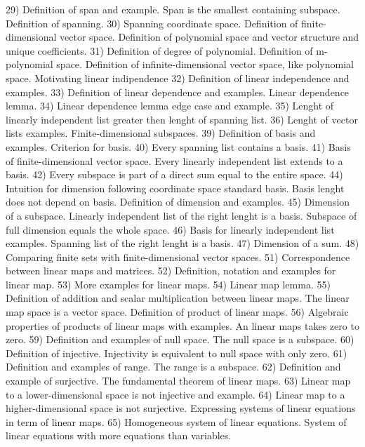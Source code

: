 \begin{multicols}{3}
  29) Definition of span and example. Span is the smallest containing subspace.
  Definition of spanning.
  30) Spanning coordinate space. Definition of finite-dimensional vector space.
  Definition of polynomial space and vector structure and unique coefficients.
  31) Definition of degree of polynomial. Definition of m-polynomial space.
  Definition of infinite-dimensional vector space, like polynomial space.
  Motivating linear indipendence
  32) Definition of linear independence and examples.
  33) Definition of linear dependence and examples. Linear dependence lemma.
  34) Linear dependence lemma edge case and example.
  35) Lenght of linearly independent list greater then lenght of spanning list.
  36) Lenght of vector lists examples. Finite-dimensional subspaces.
  39) Definition of basis and examples. Criterion for basis.
  40) Every spanning list contains a basis.
  41) Basis of finite-dimensional vector space. Every linearly independent list
  extends to a basis.
  42) Every subspace is part of a direct sum equal to the entire space.
  44) Intuition for dimension following coordinate space standard basis.
  Basis lenght does not depend on basis. Definition of dimension and examples.
  45) Dimension of a subspace. Linearly independent list of the right lenght is a
  basis. Subspace of full dimension equals the whole space.
  46) Basis for linearly independent list examples. Spanning list of the right
  lenght is a basis.
  47) Dimension of a sum.
  48) Comparing finite sets with finite-dimensional vector spaces.
  51) Correspondence between linear maps and matrices.
  52) Definition, notation and examples for linear map.
  53) More examples for linear maps.
  54) Linear map lemma.
  55) Definition of addition and scalar multiplication between linear maps.
  The linear map space is a vector space. Definition of product of linear maps.
  56) Algebraic properties of products of linear maps with examples. An linear
  maps takes zero to zero.
  59) Definition and examples of null space. The null space is a subspace.
  60) Definition of injective. Injectivity is equivalent to null space with
  only zero.
  61) Definition and examples of range. The range is a subspace.
  62) Definition and example of surjective. The fundamental theorem of linear
  maps.
  63) Linear map to a lower-dimensional space is not injective and example.
  64) Linear map to a higher-dimensional space is not surjective. Expressing
  systems of linear equations in term of linear maps.
  65) Homogeneous system of linear equations. System of linear equations with
  more equations than variables.

\end{multicols}
